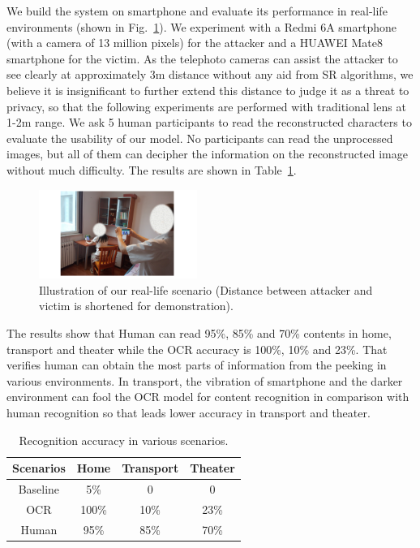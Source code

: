 We build the system on smartphone and evaluate its performance in real-life environments (shown in Fig.~\ref{fig-reallife}). We experiment with a Redmi 6A smartphone (with a camera of 13 million pixels) for the attacker and a HUAWEI Mate8 smartphone for the victim. As the telephoto cameras can assist the attacker to see clearly at approximately 3m distance without any aid from SR algorithms, we believe it is insignificant to further extend this distance to judge it as a threat to privacy, so that the following experiments are performed with traditional lens at 1-2m range. We ask 5 human participants to read the reconstructed characters to evaluate the usability of our model. No participants can read the unprocessed images, but all of them can decipher the information on the reconstructed image without much difficulty. The results are shown in Table~\ref{table-scenarios}.
\begin{figure}
	\centering
	\includegraphics[width=0.46\textwidth]{pic/reallife.pdf}
    \caption{Illustration of our real-life scenario (Distance between attacker and victim is shortened for demonstration).}
	\label{fig-reallife}
\end{figure}

The results show that Human can read 95\%, 85\% and 70\% contents in home, transport and theater while the OCR accuracy is 100\%, 10\% and 23\%. That verifies human can obtain the most parts of information from the peeking in various environments. In transport, the vibration of smartphone and the darker environment can fool the OCR model for content recognition in comparison with human recognition so that leads lower accuracy in transport and theater.

\begin{table}[!t]
    \centering
    \caption{Recognition accuracy in various scenarios.}
    \begin{tabular}{@{}cccc@{}}
        \toprule
    Scenarios & Home & Transport & Theater \\ \midrule
    Baseline & 5\% & 0 & 0\\ 
    \midrule
    OCR & 100\% & 10\% & 23\%\\ 
    Human & 95\% & 85\% & 70\%\\ \bottomrule
    \end{tabular}
    \label{table-scenarios}
\end{table}


